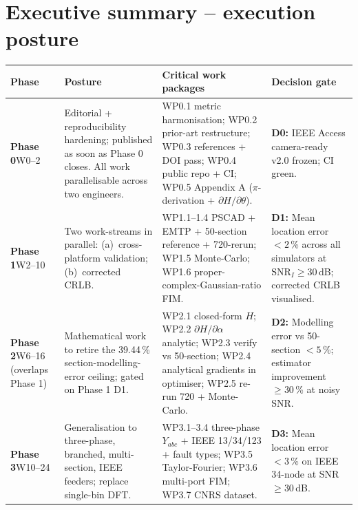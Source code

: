 \documentclass[11pt,a4paper]{article}
\begin{document}
\section{Executive summary -- execution posture}

\renewcommand{\arraystretch}{1.18}
\begin{longtable}{L{1.4cm}L{4.0cm}L{5.6cm}L{4.0cm}}
\toprule
{}
\textbf{Phase} & \textbf{Posture} & \textbf{Critical work packages} & \textbf{Decision gate}\\
\midrule
\endhead

\textbf{Phase 0}\newline W0--2 &
Editorial + reproducibility hardening; published as soon as Phase 0 closes.
All work parallelisable across two engineers. &
WP0.1 metric harmonisation; WP0.2 prior-art restructure; WP0.3 references
+ DOI pass; WP0.4 public repo + CI; WP0.5 Appendix A
($\pi$-derivation + $\partial H/\partial\theta$). &
\textbf{D0:} IEEE Access camera-ready v2.0 frozen; CI green.\\

\textbf{Phase 1}\newline W2--10 &
Two work-streams in parallel: (a)~cross-platform validation;
(b)~corrected CRLB. &
WP1.1--1.4 PSCAD + EMTP + 50-section reference + 720-rerun;
WP1.5 Monte-Carlo; WP1.6 proper-complex-Gaussian-ratio FIM. &
\textbf{D1:} Mean location error $<2$\,\% across all simulators at
$\mathrm{SNR}_I\geq 30$\,dB; corrected CRLB visualised.\\

\textbf{Phase 2}\newline W6--16 (overlaps Phase 1) &
Mathematical work to retire the 39.44\,\% section-modelling-error
ceiling; gated on Phase 1 D1. &
WP2.1 closed-form $H$; WP2.2 $\partial H/\partial\alpha$ analytic;
WP2.3 verify vs 50-section; WP2.4 analytical gradients in optimiser;
WP2.5 re-run 720 + Monte-Carlo. &
\textbf{D2:} Modelling error vs 50-section $<5$\,\%;
estimator improvement $\geq 30$\,\% at noisy SNR.\\

\textbf{Phase 3}\newline W10--24 &
Generalisation to three-phase, branched, multi-section, IEEE feeders;
replace single-bin DFT. &
WP3.1--3.4 three-phase $Y_{abc}$ + IEEE 13/34/123 + fault types;
WP3.5 Taylor-Fourier; WP3.6 multi-port FIM; WP3.7 CNRS dataset. &
\textbf{D3:} Mean location error $<3$\,\% on IEEE 34-node at SNR
$\geq 30$\,dB.\\


\end{longtable}
\end{document}

